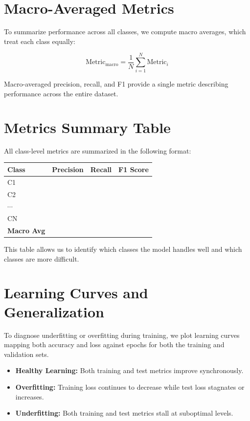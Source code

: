 \documentclass[11pt]{article}
\begin{document}
\section{Macro-Averaged Metrics}

To summarize performance across all classes, we compute macro averages, which treat each class equally:

$$
\mathrm{Metric}_{\mathrm{macro}} = \frac{1}{N} \sum_{i=1}^{N} \mathrm{Metric}_i
$$

Macro-averaged precision, recall, and F1 provide a single metric describing performance across the entire dataset.

\section{Metrics Summary Table}

All class-level metrics are summarized in the following format:

\begin{center}
\begin{tabular}{lccc}
\toprule
Class & Precision & Recall & F1 Score \\
\midrule
C1 &  &  &  \\
C2 &  &  &  \\
$\cdots$ &  &  &  \\
CN &  &  &  \\
\textbf{Macro Avg} &  &  &  \\
\bottomrule
\end{tabular}
\end{center}

This table allows us to identify which classes the model handles well and which classes are more difficult.

\section{Learning Curves and Generalization}

To diagnose underfitting or overfitting during training, we plot learning curves mapping both accuracy and loss against epochs for both the training and validation sets.

\begin{itemize}
	\item \textbf{Healthy Learning:} Both training and test metrics improve synchronously.
	\item \textbf{Overfitting:} Training loss continues to decrease while test loss stagnates or increases.
	\item \textbf{Underfitting:} Both training and test metrics stall at suboptimal levels.
\end{itemize}
\end{document}
